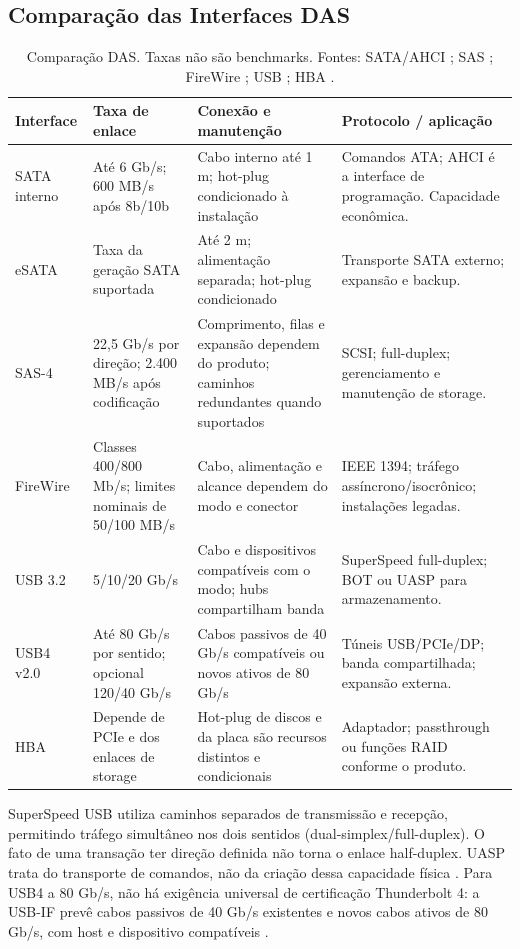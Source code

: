 \documentclass[titlepage]{article}
\begin{document}
\subsection{Comparação das Interfaces DAS}
\begin{table}[htbp]
\centering\footnotesize
\begin{tabularx}{\textwidth}{p{}p{}XX}
\toprule
Interface & Taxa de enlace & Conexão e manutenção & Protocolo / aplicação \\
\midrule
SATA interno & Até 6 Gb/s; 600 MB/s após 8b/10b & Cabo interno até 1 m; hot-plug condicionado à instalação & Comandos ATA; AHCI é a interface de programação. Capacidade econômica. \\
eSATA & Taxa da geração SATA suportada & Até 2 m; alimentação separada; hot-plug condicionado & Transporte SATA externo; expansão e backup. \\
SAS-4 & 22,5 Gb/s por direção; 2.400 MB/s após codificação & Comprimento, filas e expansão dependem do produto; caminhos redundantes quando suportados & SCSI; full-duplex; gerenciamento e manutenção de storage. \\
FireWire & Classes 400/800 Mb/s; limites nominais de 50/100 MB/s & Cabo, alimentação e alcance dependem do modo e conector & IEEE 1394; tráfego assíncrono/isocrônico; instalações legadas. \\
USB 3.2 & 5/10/20 Gb/s & Cabo e dispositivos compatíveis com o modo; hubs compartilham banda & SuperSpeed full-duplex; BOT ou UASP para armazenamento. \\
USB4 v2.0 & Até 80 Gb/s por sentido; opcional 120/40 Gb/s & Cabos passivos de 40 Gb/s compatíveis ou novos ativos de 80 Gb/s & Túneis USB/PCIe/DP; banda compartilhada; expansão externa. \\
HBA & Depende de PCIe e dos enlaces de storage & Hot-plug de discos e da placa são recursos distintos e condicionais & Adaptador; passthrough ou funções RAID conforme o produto. \\
\bottomrule
\end{tabularx}
\caption{Comparação DAS. Taxas não são benchmarks. Fontes: SATA/AHCI \cite{sata_esata,sata_cable_spec,intel_ahci}; SAS \cite{microchip_sas4,seagate_sas}; FireWire \cite{ti_firewire,ieee1394_2008}; USB \cite{usb32,ti_usb_duplex,usb4_announcement}; HBA \cite{microchip_storage}.}
\label{tab:interfaces_das}
\end{table}

SuperSpeed USB utiliza caminhos separados de transmissão e recepção, permitindo tráfego simultâneo nos dois sentidos (dual-simplex/full-duplex). O fato de uma transação ter direção definida não torna o enlace half-duplex. UASP trata do transporte de comandos, não da criação dessa capacidade física \cite{ti_usb_duplex,usb_uas}. Para USB4 a 80 Gb/s, não há exigência universal de certificação Thunderbolt 4: a USB-IF prevê cabos passivos de 40 Gb/s existentes e novos cabos ativos de 80 Gb/s, com host e dispositivo compatíveis \cite{usb4_announcement}.
\end{document}
